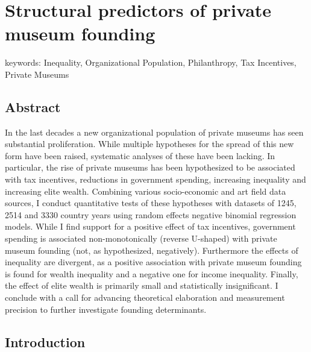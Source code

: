 \documentclass[11pt]{article}
\author{Johannes }
\date{\today}
\title{}
\begin{document}
\section*{Structural predictors of private museum founding}

\noindent
keywords: Inequality, Organizational Population, Philanthropy, Tax Incentives, Private Museums  

\subsection*{Abstract}

In the last decades a new organizational population of private museums has seen substantial proliferation.
While multiple hypotheses for the spread of this new form have been raised, systematic analyses of these have been lacking.
In particular, the rise of private museums has been hypothesized to be associated with tax incentives, reductions in government spending, increasing inequality and increasing elite wealth. 
Combining various socio-economic and art field data sources, I conduct quantitative tests of these hypotheses with datasets of 1245, 2514 and 3330 country years using random effects negative binomial regression models.
While I find support for a positive effect of tax incentives, government spending is associated non-monotonically (reverse U-shaped) with private museum founding (not, as hypothesized, negatively). 
Furthermore the effects of inequality are divergent, as a positive association with private museum founding is found for wealth inequality and a negative one for income inequality.
Finally, the effect of elite wealth is primarily small and statistically insignificant. 
I conclude with a call for advancing theoretical elaboration and measurement precision to further investigate founding determinants. 





\subsection*{Introduction}
\end{document}
